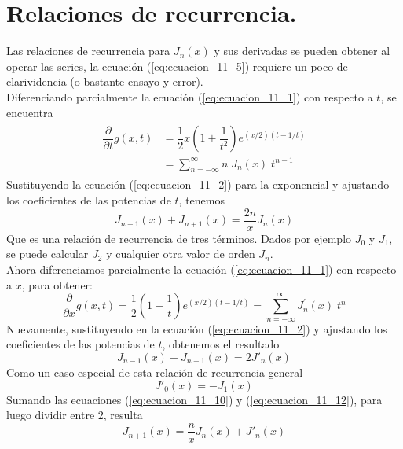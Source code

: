 \section{Relaciones de recurrencia.}
Las relaciones de recurrencia para $J_{n}(x)$ y sus derivadas se pueden obtener al operar las series, la ecuación (\ref{eq:ecuacion_11_5}) requiere un poco de clarividencia (o bastante ensayo y error).
\\
Diferenciando parcialmente la ecuación (\ref{eq:ecuacion_11_1}) con respecto a $t$, se encuentra
\begin{eqnarray}
\begin{aligned}
\dfrac{\partial}{\partial t} g(x,t) &= \dfrac{1}{2} x \left( 1 + \dfrac{1}{t^{2}} \right) e^{(x/2)(t-1/t)} \\
&= \sum_{n=-\infty}^{\infty} n \; J_{n}(x) \; t^{n-1}
\end{aligned}
\label{eq:ecuacion_11_9}
\end{eqnarray}
Sustituyendo la ecuación (\ref{eq:ecuacion_11_2}) para la exponencial y ajustando los coeficientes de las potencias de $t$, tenemos
\begin{equation}
J_{n-1}(x) + J_{n+1}(x) = \dfrac{2n}{x} J_{n} (x)
\label{eq:ecuacion_11_10}
\end{equation}
Que es una relación de recurrencia de tres términos. Dados por ejemplo $J_{0}$ y $J_{1}$, se puede calcular $J_{2}$ y cualquier otra valor de orden $J_{n}$.
\\
Ahora diferenciamos parcialmente la ecuación (\ref{eq:ecuacion_11_1}) con respecto a $x$, para obtener:
\begin{equation}
\dfrac{\partial}{\partial x} g(x,t) = \dfrac{1}{2} \left( 1 - \dfrac{1}{t} \right) e^{(x/2)(t-1/t)} = \sum_{n=-\infty}^{\infty} J^{\prime}_{n} (x) \; t^{n}
\label{eq:ecuacion_11_11}
\end{equation}
Nuevamente, sustituyendo en la ecuación (\ref{eq:ecuacion_11_2}) y ajustando los coeficientes de las potencias de $t$, obtenemos el resultado
\begin{equation}
J_{n-1}(x) - J_{n+1}(x) = 2 J'_{n}(x)
\label{eq:ecuacion_11_12}
\end{equation}
Como un caso especial de esta relación de recurrencia general
\begin{equation}
J'_{0}(x) = - J_{1}(x)
\label{eq:ecuacion_11_13}
\end{equation}
Sumando las ecuaciones (\ref{eq:ecuacion_11_10}) y (\ref{eq:ecuacion_11_12}), para luego dividir entre 2, resulta
\begin{equation}
J_{n+1}(x) = \dfrac{n}{x} J_{n}(x) + J'_{n}(x)
\label{eq:ecuacion_11_14}
\end{equation}
